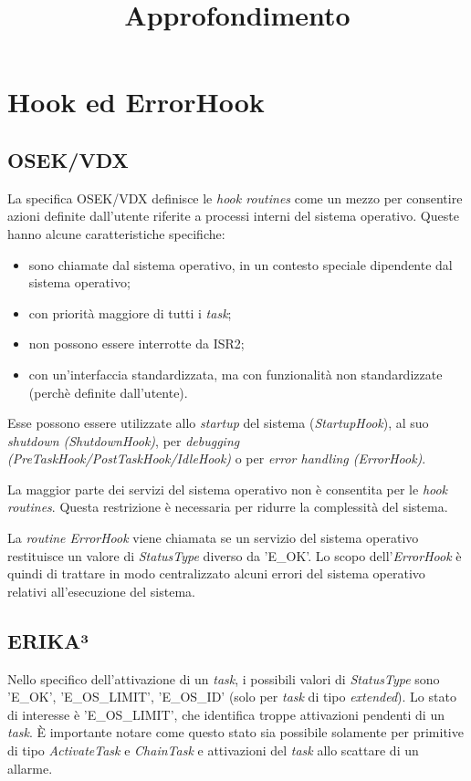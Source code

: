 \documentclass{article}
\title{Approfondimento}
\begin{document}
	
\section{Hook ed ErrorHook}
\subsection{OSEK/VDX}
La specifica OSEK/VDX definisce le \textit{hook routines} come un mezzo per consentire azioni definite dall'utente riferite a processi interni del sistema operativo. Queste hanno alcune caratteristiche specifiche:

\begin{itemize}
\item sono chiamate dal sistema operativo, in un contesto speciale dipendente dal sistema operativo;
\item con priorità maggiore di tutti i \textit{task};
\item non possono essere interrotte da ISR2;
\item con un'interfaccia standardizzata, ma con funzionalità non standardizzate (perchè definite dall'utente).
\end{itemize}

Esse possono essere utilizzate allo \textit{startup} del sistema (\textit{StartupHook}), al suo \textit{shutdown (ShutdownHook)}, per \textit{debugging (PreTaskHook/PostTaskHook/IdleHook)} o per \textit{error handling (ErrorHook)}.

La maggior parte dei servizi del sistema operativo non è consentita per le \textit{hook routines}. Questa restrizione è necessaria per ridurre la complessità del sistema.

La \textit{routine ErrorHook} viene chiamata se un servizio del sistema operativo restituisce un valore di \textit{StatusType} diverso da 'E\_OK'. Lo scopo dell'\textit{ErrorHook} è quindi di trattare in modo centralizzato alcuni errori del sistema operativo relativi all'esecuzione del sistema.

\subsection{ERIKA³}
Nello specifico dell'attivazione di un \textit{task}, i possibili valori di \textit{StatusType} sono 'E\_OK', 'E\_OS\_LIMIT', 'E\_OS\_ID' (solo per \textit{task} di tipo \textit{extended}). Lo stato di interesse è 'E\_OS\_LIMIT', che identifica troppe attivazioni pendenti di un \textit{task}. È importante notare come questo stato sia possibile solamente per primitive di tipo \textit{ActivateTask} e \textit{ChainTask} e attivazioni del \textit{task} allo scattare di un allarme.
\end{document}
